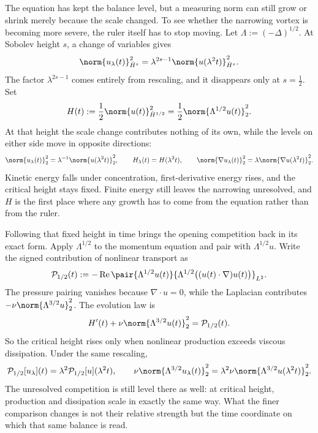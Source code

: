 The equation has kept the balance level, but a measuring norm can still grow or shrink merely because the scale changed. To see whether the narrowing vortex is becoming more severe, the ruler itself has to stop moving. Let \(\Lambda:=(-\Delta)^{1/2}\). At Sobolev height \(s\), a change of variables gives
\[
  \norm{u_\lambda(t)}_{\dot H^s}^2
  =
  \lambda^{2s-1}
  \norm{u(\lambda^2t)}_{\dot H^s}^2.
\]
The factor \(\lambda^{2s-1}\) comes entirely from rescaling, and it disappears only at \(s=\tfrac12\). Set
\[
  H(t)
  :=
  \frac12\norm{u(t)}_{\dot H^{1/2}}^2
  =
  \frac12\norm{\Lambda^{1/2}u(t)}_2^2.
\]
At that height the scale change contributes nothing of its own, while the levels on either side move in opposite directions:
\[
  \norm{u_\lambda(t)}_2^2
  =
  \lambda^{-1}\norm{u(\lambda^2t)}_2^2,
  \qquad
  H_\lambda(t)=H(\lambda^2t),
  \qquad
  \norm{\nabla u_\lambda(t)}_2^2
  =
  \lambda\norm{\nabla u(\lambda^2t)}_2^2.
\]
Kinetic energy falls under concentration, first-derivative energy rises, and the critical height stays fixed. Finite energy still leaves the narrowing unresolved, and \(H\) is the first place where any growth has to come from the equation rather than from the ruler.


Following that fixed height in time brings the opening competition back in its exact form. Apply \(\Lambda^{1/2}\) to the momentum equation and pair with \(\Lambda^{1/2}u\). Write the signed contribution of nonlinear transport as
\[
  \mathcal P_{1/2}(t)
  :=
  -\operatorname{Re}
  \pair
    {\Lambda^{1/2}u(t)}
    {\Lambda^{1/2}\bigl((u(t)\cdot\nabla)u(t)\bigr)}_{L^2}.
\]
The pressure pairing vanishes because \(\nabla\cdot u=0\), while the Laplacian contributes \(-\nu\norm{\Lambda^{3/2}u}_2^2\). The evolution law is
\[
  H'(t)
  +
  \nu\norm{\Lambda^{3/2}u(t)}_2^2
  =
  \mathcal P_{1/2}(t).
\]
So the critical height rises only when nonlinear production exceeds viscous dissipation. Under the same rescaling,
\[
  \mathcal P_{1/2}[u_\lambda](t)
  =
  \lambda^2\mathcal P_{1/2}[u](\lambda^2t),
  \qquad
  \nu\norm{\Lambda^{3/2}u_\lambda(t)}_2^2
  =
  \lambda^2\nu\norm{\Lambda^{3/2}u(\lambda^2t)}_2^2.
\]
The unresolved competition is still level there as well: at critical height, production and dissipation scale in exactly the same way. What the finer comparison changes is not their relative strength but the time coordinate on which that same balance is read.


